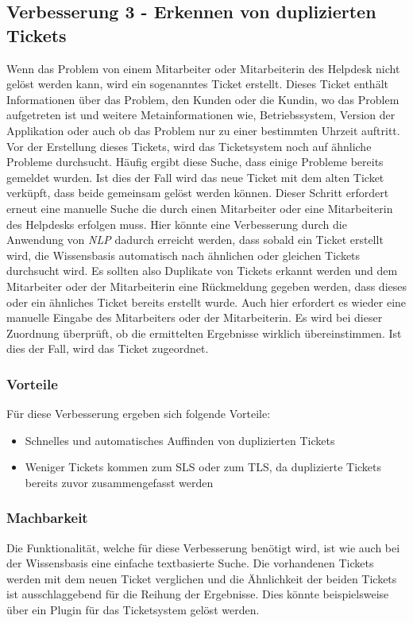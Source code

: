 \subsection{Verbesserung 3 - Erkennen von duplizierten Tickets}
Wenn das Problem von einem Mitarbeiter oder Mitarbeiterin des Helpdesk nicht gelöst werden kann, wird ein sogenanntes Ticket erstellt. Dieses Ticket enthält Informationen über das Problem, den Kunden oder die Kundin, wo das Problem aufgetreten ist und weitere Metainformationen wie, Betriebssystem, Version der Applikation oder auch ob das Problem nur zu einer bestimmten Uhrzeit auftritt. Vor der Erstellung dieses Tickets, wird das Ticketsystem noch auf ähnliche Probleme durchsucht. Häufig ergibt diese Suche, dass einige Probleme bereits gemeldet wurden. Ist dies der Fall wird das neue Ticket mit dem alten Ticket verküpft, dass beide gemeinsam gelöst werden können. Dieser Schritt erfordert erneut eine manuelle Suche die durch einen Mitarbeiter oder eine Mitarbeiterin des Helpdesks erfolgen muss. Hier könnte eine Verbesserung durch die Anwendung von \textit{NLP} dadurch erreicht werden, dass sobald ein Ticket erstellt wird, die Wissensbasis automatisch nach ähnlichen oder gleichen Tickets durchsucht wird. Es sollten also Duplikate von Tickets erkannt werden und dem Mitarbeiter oder der Mitarbeiterin eine Rückmeldung gegeben werden, dass dieses oder ein ähnliches Ticket bereits erstellt wurde. Auch hier erfordert es wieder eine manuelle Eingabe des Mitarbeiters oder der Mitarbeiterin. Es wird bei dieser Zuordnung überprüft, ob die ermittelten Ergebnisse wirklich übereinstimmen. Ist dies der Fall, wird das Ticket zugeordnet.

\subsubsection{Vorteile}
Für diese Verbesserung ergeben sich folgende Vorteile:

\begin{itemize}
	\item Schnelles und automatisches Auffinden von duplizierten Tickets
	\item Weniger Tickets kommen zum SLS oder zum TLS, da duplizierte Tickets bereits zuvor zusammengefasst werden
\end{itemize}

\subsubsection{Machbarkeit}
Die Funktionalität, welche für diese Verbesserung benötigt wird, ist wie auch bei der Wissensbasis eine einfache textbasierte Suche. Die vorhandenen Tickets werden mit dem neuen Ticket verglichen und die Ähnlichkeit der beiden Tickets ist ausschlaggebend für die Reihung der Ergebnisse. Dies könnte beispielsweise über ein Plugin für das Ticketsystem gelöst werden.

